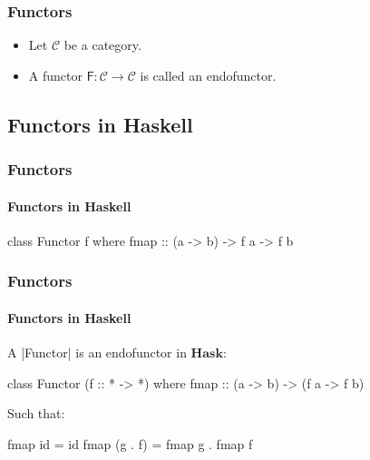 \documentclass{beamer}
\newcommand{\cat}[1]{\ensuremath{\mathcal{#1}}}
\newcommand{\catbf}[1]{\ensuremath{\mathbf{#1}}\xspace}
\newcommand{\hask}{\catbf{Hask}}
\newcommand{\func}[1]{\ensuremath{\mathsf{#1}}}
\begin{document}

\begin{frame}[label={def:endofunctor}]
  \frametitle{Functors}

  \begin{definition}[Endofunctor]
    \begin{itemize}
    \item
      Let \cat{C} be a category.
    \item
      A functor $\func{F}: \cat{C} \to \cat{C}$ is called an
      endofunctor.
    \end{itemize}
  \end{definition}

\end{frame}


\subsection{Functors in Haskell}


\begin{frame}[fragile]
  \frametitle{Functors}
  \framesubtitle{Functors in Haskell}

  \begin{definition}
    \begin{code}
class Functor f where
  fmap :: (a -> b) -> f a -> f b
    \end{code}
  \end{definition}

\end{frame}


\begin{frame}[fragile]
  \frametitle{Functors}
  \framesubtitle{Functors in Haskell}

  \begin{definition}
    A |Functor| is an endofunctor in \hask:
    \begin{code}
class Functor (f :: * -> *) where
  fmap :: (a -> b) -> (f a -> f b)
    \end{code}
    Such that:
    \begin{code}
fmap id      = id
fmap (g . f) = fmap g . fmap f
    \end{code}
  \end{definition}

\end{frame}
\end{document}
